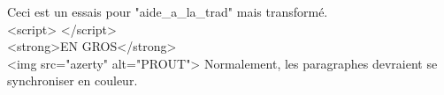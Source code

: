 Ceci est un essais pour "aide_a_la_trad" mais transformé.\\
<script> </script>\\
<strong>EN GROS</strong>\\
<img src="azerty" alt="PROUT">
Normalement, les paragraphes devraient se synchroniser en couleur.\\
\\